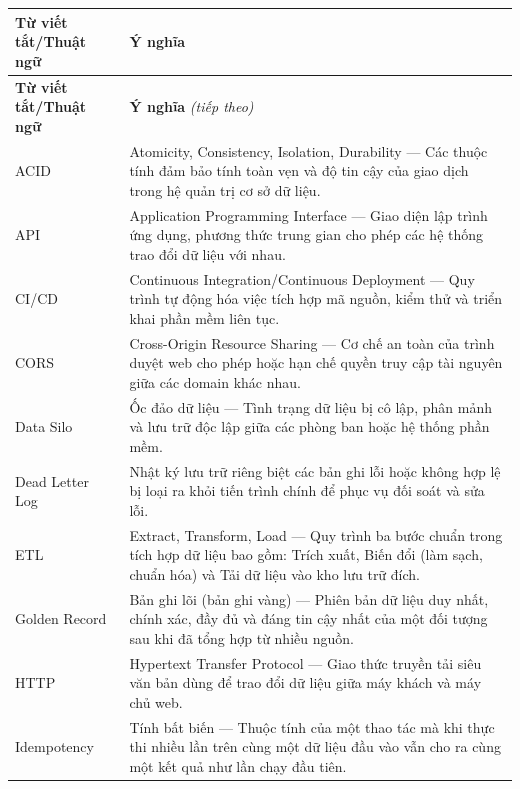 \documentclass[twoside, final]{hcmut-report}
\begin{document}
\begin{center}
\renewcommand{\arraystretch}{1.5}
\begin{longtable}{|p{4cm}|p{11cm}|}
\hline
\textbf{Từ viết tắt/Thuật ngữ} & \textbf{Ý nghĩa} \\ \hline
\endfirsthead

\hline
\textbf{Từ viết tắt/Thuật ngữ} & \textbf{Ý nghĩa} \textit{(tiếp theo)} \\ \hline
\endhead

\hline
\endfoot

\hline
\endlastfoot

ACID & Atomicity, Consistency, Isolation, Durability --- Các thuộc tính đảm bảo tính toàn vẹn và độ tin cậy của giao dịch trong hệ quản trị cơ sở dữ liệu. \\ \hline
API & Application Programming Interface --- Giao diện lập trình ứng dụng, phương thức trung gian cho phép các hệ thống trao đổi dữ liệu với nhau. \\ \hline
CI/CD & Continuous Integration/Continuous Deployment --- Quy trình tự động hóa việc tích hợp mã nguồn, kiểm thử và triển khai phần mềm liên tục. \\ \hline
CORS & Cross-Origin Resource Sharing --- Cơ chế an toàn của trình duyệt web cho phép hoặc hạn chế quyền truy cập tài nguyên giữa các domain khác nhau. \\ \hline
Data Silo & Ốc đảo dữ liệu --- Tình trạng dữ liệu bị cô lập, phân mảnh và lưu trữ độc lập giữa các phòng ban hoặc hệ thống phần mềm. \\ \hline
Dead Letter Log & Nhật ký lưu trữ riêng biệt các bản ghi lỗi hoặc không hợp lệ bị loại ra khỏi tiến trình chính để phục vụ đối soát và sửa lỗi. \\ \hline
ETL & Extract, Transform, Load --- Quy trình ba bước chuẩn trong tích hợp dữ liệu bao gồm: Trích xuất, Biến đổi (làm sạch, chuẩn hóa) và Tải dữ liệu vào kho lưu trữ đích. \\ \hline
Golden Record & Bản ghi lõi (bản ghi vàng) --- Phiên bản dữ liệu duy nhất, chính xác, đầy đủ và đáng tin cậy nhất của một đối tượng sau khi đã tổng hợp từ nhiều nguồn. \\ \hline
HTTP & Hypertext Transfer Protocol --- Giao thức truyền tải siêu văn bản dùng để trao đổi dữ liệu giữa máy khách và máy chủ web. \\ \hline
Idempotency & Tính bất biến --- Thuộc tính của một thao tác mà khi thực thi nhiều lần trên cùng một dữ liệu đầu vào vẫn cho ra cùng một kết quả như lần chạy đầu tiên. \\ \hline

\end{longtable}
\end{center}
\end{document}
